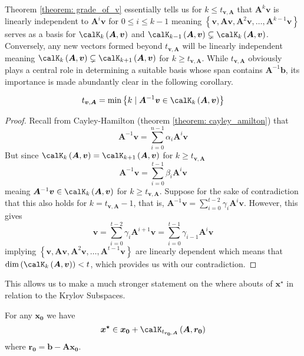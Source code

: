 Theorem \ref{theorem: grade_of_v} essentially tells us for $k \leq t_{\bm{v}, \bm{A}}$ that $\bm{A}^k \bm{v}$ is linearly independent to $\bm{A}^i \bm{v}$ for $0 \leq i \leq k-1$ meaning $\left\{ \bm{v}, \bm{A} \bm{v}, \bm{A}^2 \bm{v}, \ldots , \bm{A}^{k-1} \bm{v} \right\}$ serves as a basis for $\calK_{k} \left( \bm{A},\bm{v} \right)$ and $\calK_{k-1} \left( \bm{A},\bm{v} \right) \subsetneq \calK_{k} \left( \bm{A},\bm{v} \right)$. Conversely, any new vectors formed beyond $t_{\bm{v}, \bm{A}}$ will be linearly independent meaning $\calK_{k} \left( \bm{A},\bm{v} \right) \subsetneq \calK_{k+1} \left( \bm{A},\bm{v} \right)$ for $k \geq t_{\bm{v}, \bm{A}}$. While $t_{\bm{v}, \bm{A}}$ obviously plays a central role in determining a suitable basis whose span contains $\bm{A}^{-1} \bm{b}$, its importance is made abundantly clear in the following corollary.
\begin{cor} \label{theorem: grade_as_min}
    \[
        t_{\bm{v}, \bm{A}} = \min \left\{k \mid \bm{A}^{-1} \bm{v} \in \calK_{k} \left( \bm{A},\bm{v} \right) \right\}
    \]
\end{cor}
\begin{proof}
    Recall from Cayley-Hamilton (theorem \ref{theorem: cayley_amilton}) that
    \[
        \bm{A}^{-1} \bm{v} = \sum_{i=0}^{n-1} \alpha_{i} \bm{A}^{i} \bm{v}
    \]
    But since $\calK_{k} \left( \bm{A},\bm{v} \right) = \calK_{k+1} \left( \bm{A},\bm{v} \right)$ for $k \geq t_{\bm{v}, \bm{A}}$
    \[
        \bm{A}^{-1} \bm{v} = \sum_{i=0}^{t-1} \beta_{i} \bm{A}^{i} \bm{v}
    \]
    meaing $\bm{A}^{-1} \bm{v} \in \calK_{k} \left( \bm{A},\bm{v} \right)$ for $k \geq t_{\bm{v}, \bm{A}}$. Suppose for the sake of contradiction that this also holds for $k = t_{\bm{v}, \bm{A}} - 1$, that is, $\bm{A}^{-1} \bm{v} = \sum_{i=0}^{t-2} \gamma_{i} \bm{A}^{i} \bm{v}$. However, this gives
    \[
        \bm{v} = \sum_{i=0}^{t-2} \gamma_{i} \bm{A}^{i+1} \bm{v} = \sum_{i=0}^{t-1} \gamma_{i-1} \bm{A}^{i} \bm{v}
    \]
    implying $\left\{ \bm{v}, \bm{A} \bm{v}, \bm{A}^2 \bm{v}, \ldots , \bm{A}^{t-1} \bm{v} \right\}$ are linearly dependent which means that $\operatorname{dim} \left( \calK_{k} \left( \bm{A} , \bm{v} \right) \right) < t$, which provides us with our contradiction.
\end{proof}
This allows us to make a much stronger statement on the where abouts of $\bm{x^{\star}}$ in relation to the Krylov Subspaces.
\begin{cor} \label{theorem: sol_in_krylov}
    For any $\bm{x_0}$ we have
    \[
        \bm{x^{\star}} \in \bm{x_0} + \calK_{t_{\bm{r_0}, \bm{A}}} \left( \bm{A},\bm{r_0} \right)
    \]
    where $\bm{r_0} = \bm{b} - \bm{A} \bm{x_0}$.
\end{cor}